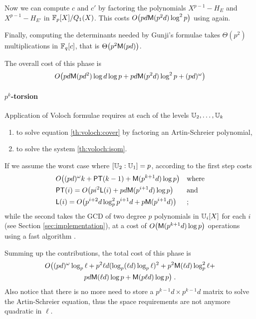 Now we can compute $c$ and $c'$ by factoring the polynomials
$X^{p-1}-H_E$ and $X^{p-1}-H_{E'}$ in $\mathbb{F}_p[X]/Q_1(X)$. This costs
$O\bigl(pd\mathrm{\sf M}(p^2d)\log^2 p\bigr)$ using \cite[Coro.  14.16]{vzGG}
again.

Finally, computing the determinants needed by Gunji's formulae takes
$\Theta(p^2)$ multiplications in $\mathbb{F}_q[c]$, that is
$\Theta\bigl(p^2\mathrm{\sf M}(pd)\bigr)$.

The overall cost of this phase is
\begin{equation}
  \label{eq:gunji-complexity}
  O\bigl(pd\mathrm{\sf M}(pd^2)\log d\log p + pd\mathrm{\sf M}(p^2d)\log^2 p + (pd)^\omega \bigr)
\end{equation}


\paragraph{$p^k$-torsion}
Application of Voloch formulae requires at each of the levels
$\mathbb{U}_2,\ldots,\mathbb{U}_k$
\begin{enumerate}
\item to solve equation \eqref{th:voloch:cover} by factoring an
  Artin-Schreier polynomial,
\item to solve the system \eqref{th:voloch:isom}.
\end{enumerate}
If we assume the worst case where $[\mathbb{U}_2:\mathbb{U}_1] = p$, according to
\cite[Th. 13]{DFS09} the first step costs
\begin{align*}
  &O\bigl((pd)^\omega k + {\sf PT}(k-1) + \mathrm{\sf M}(p^{k+1}d)\log p\bigr)
  &&\text{where}\\
  &{\sf PT}(i) = O\bigl(pi^2{\sf L}(i) + pd\mathrm{\sf M}(p^{i+1}d)\log p\bigr)
  &&\text{and}\\
  &{\sf L}(i) = O\bigl(p^{i+2}d\log_p^2{p^{i+1}d} + p\mathrm{\sf M}(p^{i+1}d)\bigr)
  &&\text{;}
\end{align*}
while the second takes the GCD of two degree $p$ polynomials in
$\mathbb{U}_i[X]$ for each $i$ (see Section \ref{sec:implementation}), at a
cost of $O\bigl(\mathrm{\sf M}(p^{k+1}d)\log p\bigr)$ operations using a fast
algorithm \cite[$\S$11.1]{vzGG}.

Summing up the contributions, the total cost of this phase is
\begin{multline}
  \label{eq:C2-AS:complexity:p^k}
  O\bigl((pd)^\omega \log_p\ell + p^2\ell d(\log_p(\ell d)\log_p\ell)^2 + p^2\mathrm{\sf M}(\ell d)\log_p^2\ell +\\
  pd\mathrm{\sf M}(\ell d)\log p + \mathrm{\sf M}(p\ell d)\log p\bigr)
  \;\text{.}  
\end{multline}
Also notice that there is no more need to store a $p^{k-1}d\times
p^{k-1}d$ matrix to solve the Artin-Schreier equation, thus the space
requirements are not anymore quadratic in $\ell$.


